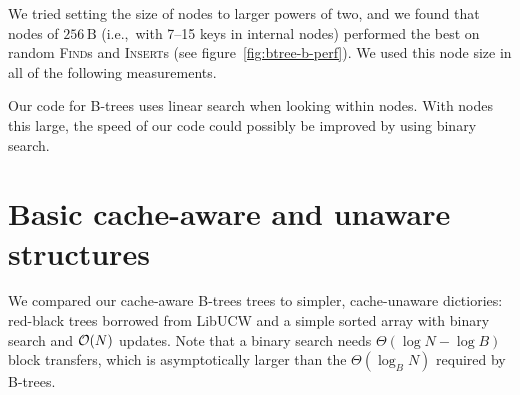 We tried setting the size of nodes to larger powers of two, and we found
that nodes of $256\,\text{B}$ (i.e.,\ with 7--15 keys in internal nodes)
performed the best on random \textsc{Find}s and \textsc{Insert}s (see
figure~\ref{fig:btree-b-perf}).
We used this node size in all of the following measurements.

Our code for B-trees uses linear search when looking within nodes.
With nodes this large, the speed of our code could possibly be improved
by using binary search.

\section{Basic cache-aware and unaware structures}
We compared our cache-aware B-trees trees to simpler, cache-unaware dictiories:
red-black trees borrowed from LibUCW and a simple sorted array with binary
search and $\mathcal{O}(N)$ updates. Note that a binary search needs
$\Theta(\log N-\log B)$ block transfers, which is asymptotically larger than
the $\Theta(\log_B N)$ required by B-trees.

